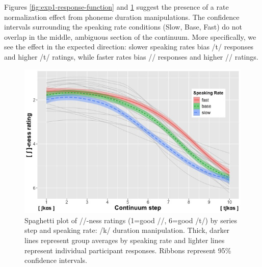 Figures \ref{fig:exp1-response-function} and \ref{fig:exp1-eshness-rating} suggest the presence of a rate normalization effect from phoneme duration manipulations. The confidence intervals surrounding the speaking rate conditions (Slow, Base, Fast) do not overlap in the middle, ambiguous section of the continuum. More specifically, we see the effect in the expected direction: slower speaking rates bias /t\textesh/ responses and higher /t\textesh/ ratings, while faster rates bias /\textesh/ responses and higher /\textesh/ ratings.

\begin{figure}[H]
\centering
\includegraphics[scale=.5]{figures/exp1-eshness-rating.jpeg}
\caption{\label{fig:exp1-eshness-rating} Spaghetti plot of /\textesh/-ness ratings (1=good /\textesh/, 6=good /t\textesh/) by series step and speaking rate: /k/ duration manipulation. Thick, darker lines represent group averages by speaking rate and lighter lines represent individual participant responses. Ribbons represent 95\% confidence intervals.}
\end{figure}

